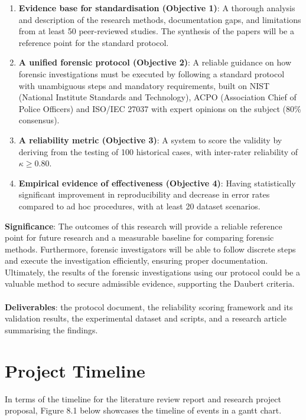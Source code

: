 \documentclass[a4paper]{report}
\begin{document}
\begin{justify}
\begin{enumerate}
    \item  \textbf{Evidence base for standardisation (Objective 1)}: A thorough analysis and description of the research methods, documentation gaps, and limitations from at least 50 peer-reviewed studies. The synthesis of the papers will be a reference point for the standard protocol.
    \item  \textbf{A unified forensic protocol (Objective 2)}: A reliable guidance on how forensic investigations must be executed by following a standard protocol with unambiguous steps and mandatory requirements, built on NIST (National Institute Standards and Technology), ACPO (Association Chief of Police Officers) and ISO/IEC 27037 with expert opinions on the subject (80\% consensus).
    \item \textbf{A reliability metric (Objective 3)}:  A system to score the validity by deriving from the testing of 100 historical cases, with inter-rater reliability of $\kappa \geq 0.80$.
    \item  \textbf{Empirical evidence of effectiveness (Objective 4)}: Having statistically significant improvement in reproducibility and decrease in error rates compared to ad hoc procedures, with at least 20 dataset scenarios.
\end{enumerate}


\textbf{Significance}: The outcomes of this research will provide a reliable reference point for future research and a measurable baseline for comparing forensic methods. Furthermore, forensic investigators will be able to follow discrete steps and execute the investigation efficiently, ensuring proper documentation. Ultimately, the results of the forensic investigations using our protocol could be a valuable method to secure admissible evidence, supporting the Daubert criteria.
\\
\\
\textbf{Deliverables}: the protocol document, the reliability scoring framework and its validation results, the experimental dataset and scripts, and a research article summarising the findings.

\chapter{Project Timeline}

In terms of the timeline for the literature review report and research project proposal, Figure 8.1 below showcases the timeline of events in a gantt chart.


\end{justify}
\end{document}
